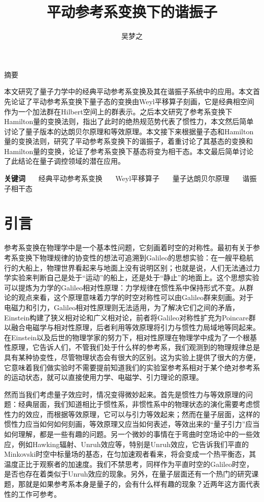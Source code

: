\documentclass[a4paper]{article}
\title{平动参考系变换下的谐振子}
\author{吴梦之}
\begin{document}
    \maketitle

    \begin{center}
        \fontsize{18pt}{0}摘\quad\quad 要
    \end{center}

        本文研究了量子力学中的经典平动参考系变换及其在谐振子系统中的应用。本文首先论证了平动参考系变换下量子态的变换由Weyl平移算子刻画，它是经典相空间作为一个加法群在Hilbert空间上的群表示。之后本文研究了参考系变换下Hamilton量的变换法则，指出了此时的绝热规范势代表了惯性力，本文然后简单讨论了量子版本的达朗贝尔原理和等效原理。本文接下来根据量子态和Hamilton量的变换法则，研究了平动参考系变换下的谐振子，着重讨论了其基态的变换和Hamilton量的变换，论证了参考系变换下基态将变为相干态。本文最后简单讨论了此结论在量子调控领域的潜在应用。

    \textbf{关键词} \ \ \ 经典平动参考系变换 \ \ \ Weyl平移算子 \ \ \ 量子达朗贝尔原理 \ \ \ 谐振子相干态


    \section{引言}

        参考系变换在物理学中是一个基本性问题，它刻画着时空的对称性。最初有关于参考系变换下物理规律的协变性的想法可追溯到Galileo的思想实验：在一艘平稳航行的大船上，物理世界看起来与地面上没有说明区别；也就是说，人们无法通过力学实验来判断自己是处于“运动”的船上，还是处于“静止”的地面上。这个思想实验可以提炼为力学的Galileo相对性原理：力学规律在惯性系中保持形式不变。从群论的观点来看，这个原理意味着力学的时空对称性可以由Galileo群来刻画。对于电磁力和引力，Galileo相对性原理则无法适用，为了解决它们之间的矛盾，Einstein构建了狭义相对论和广义相对论，前者将Galileo对称性扩充为Poincare群以融合电磁学与相对性原理，后者利用等效原理将引力与惯性力局域地等同起来。在Einstein以及后世的物理学家的努力下，相对性原理在物理学中成为了一个根基性原理，它告诉人们，不管我们处于什么样的参考系，我们观测到的物理规律总是具有某种协变性，尽管物理状态会有很大的区别。这为实验上提供了很大的方便，它意味着我们做实验时不需要提前知道我们的实验室参考系相对于某个绝对参考系的运动状态，就可以直接使用力学、电磁学、引力理论的原理。

        然而当我们考虑量子效应时，情况变得微妙起来。首先是惯性力与等效原理的问题：经典层面，我们知道相比于惯性系，非惯性系中的物理状态的演化需要考虑惯性力的效应，而根据等效原理，它可以与引力等效起来；然而在量子层面，这样的惯性力应当如何如何刻画，等效原理又应当如何表述，等效出来的“量子引力”应当如何理解，都是一些有趣的问题。另一个微妙的事情在于弯曲时空场论中的一些效应，例如Hawking辐射、Unruh效应等，特别是Unruh效应\cite{bib:one,bib:two}，它告诉我们平直的Minkovski时空中标量场的基态，在匀加速观者看来，将会变成一个热平衡态，其温度正比于观察者的加速度。我们不禁思考，同样作为平直时空的Galileo时空，是否也存在着类似于Unruh效应的现象。另外，在量子层面还有一个热门的研究课题，那就是如果参考系本身是量子的，会有什么样有趣的现象？近两年这方面代表性的工作可参考\cite{bib:three, bib:four,bib:five}。
\end{document}
